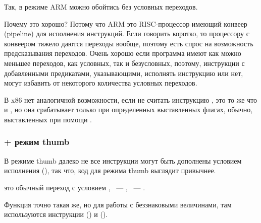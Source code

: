 


Так, в режиме ARM можно обойтись без условных переходов.

Почему это хорошо? Потому что ARM это RISC-процессор имеющий конвеер (pipeline) для исполнения инструкций. 
Если говорить 
коротко, то процессору с конвеером тяжело даются переходы вообще, поэтому есть спрос на возможность 
предсказывания переходов.
Очень хорошо если программа имеют как можно меньшее переходов, как условных, так и безусловных, поэтому, 
инструкции с добавленными предикатами, указывающими,
исполнять инструкцию или нет, могут избавить от некоторого количества условных переходов.

В x86 нет аналогичной возможности, если не считать инструкцию , это то же что и \MOV, но она срабатывает
только при определенных выставленных флагах, обычно, выставленных при помощи \CMP.

\subsubsection{\OptimizingKeil + режим thumb}



В режиме thumb далеко не все инструкции могут быть дополнены условием исполнения (), 
так что, код для режима thumb выглядит привычнее.

 это обычный переход с условием ,  ~--- , 
 ~--- .

Функция  точно такая же, но для работы с беззнаковыми величинами, там используются 
инструкции  () и  ().

